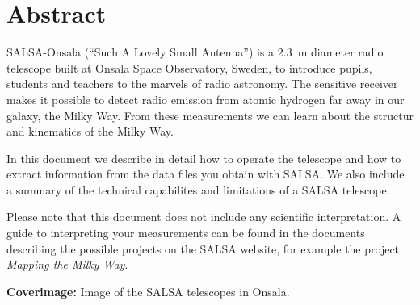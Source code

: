 \chapter*{Abstract}
SALSA-Onsala (``Such A Lovely Small Antenna'') is a 2.3~m diameter radio
telescope built at Onsala Space Observatory, Sweden, to introduce pupils,
students and teachers to the marvels of radio astronomy.  The sensitive
receiver makes it possible to detect radio emission from atomic hydrogen far
away in our galaxy, the Milky Way. From these measurements we can learn about
the structur and kinematics of the Milky Way.

In this document we describe in detail how to operate the telescope
and how to extract information from the data files you obtain with SALSA.
We also include a summary of the technical capabilites and limitations
of a SALSA telescope.

Please note that this document does not include any scientific interpretation.
A guide to interpreting your measurements can be found in the documents 
describing the possible projects on the SALSA website, for example the project
\emph{Mapping the Milky Way}.

\vspace{9cm}




{\bf Coverimage:} Image of the SALSA telescopes in Onsala.
